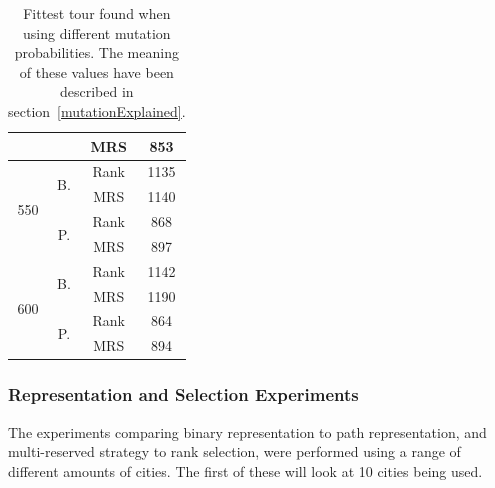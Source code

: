 \documentclass[10pt,a4paper,openbib]{article}
\begin{document}
\begin{multicols}{2}
\begin{table}[H]
\begin{tabular}{|c|c|c|c|}
                                        &                                    & MRS                                & 853                                   \\ \hline
\multirow{4}{*}{550}                    & \multirow{2}{*}{B.}                & Rank                               & 1135                                  \\ \cline{3-4} 
                                        &                                    & MRS                                & 1140                                  \\ \cline{2-4} 
                                        & \multirow{2}{*}{P.}                & Rank                               & 868                                   \\ \cline{3-4} 
                                        &                                    & MRS                                & 897                                   \\ \hline
\multirow{4}{*}{600}                    & \multirow{2}{*}{B.}                & Rank                               & 1142                                  \\ \cline{3-4} 
                                        &                                    & MRS                                & 1190                                  \\ \cline{2-4} 
                                        & \multirow{2}{*}{P.}                & Rank                               & 864                                   \\ \cline{3-4} 
                                        &                                    & MRS                                & 894                                   \\ \hline
\end{tabular}
\caption{Fittest tour found when using different mutation probabilities. The meaning of these values have been described in section~\ref{mutationExplained}.}
\label{table:mutation20cities}
\end{table}

\subsubsection{Representation and Selection Experiments}
The experiments comparing binary representation to path representation, and multi-reserved strategy to rank selection, were performed using a range of different amounts of cities. The first of these will look at 10 cities being used. \\


\end{multicols}
\end{document}
